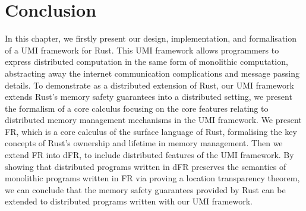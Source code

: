 
\section{Conclusion}
\label{chap3:conclusion}
In this chapter, we firstly present our design, implementation, and formalisation of a UMI framework for Rust. This UMI framework allows programmers to express distributed computation in the same form of monolithic computation, abstracting away the internet communication complications and message passing details. To demonstrate as a distributed extension of Rust, our UMI framework extends Rust's memory safety guarantees into a distributed setting, we present the formalism of a core calculus focusing on the core features relating to distributed memory management mechanisms in the UMI framework. We present FR, which is a core calculus of the surface language of Rust, formalising the key concepts of Rust's ownership and lifetime in memory management. Then we extend FR into dFR, to include distributed features of the UMI framework. By showing that distributed programs written in dFR preserves the semantics of monolithic programs written in FR via proving a location transparency theorem, we can conclude that the memory safety guarantees provided by Rust can be extended to distributed programs written with our UMI framework.

\noindent
\begin{center}
\vspace{0.3em}
\vspace{-0.7em}
\end{center}